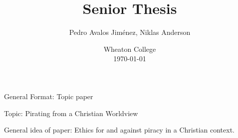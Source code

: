 \documentclass[onecolumn, 12pt]{article}
\title{Senior Thesis}
\author{Pedro Avalos Jim\'enez, Niklas Anderson}
\date{Wheaton College\\\today}
\begin{document}
\maketitle

General Format: Topic paper

Topic: Pirating from a Christian Worldview

General idea of paper: Ethics for and against piracy in a Christian context.

\nocite{*}
\printbibliography
\end{document}
